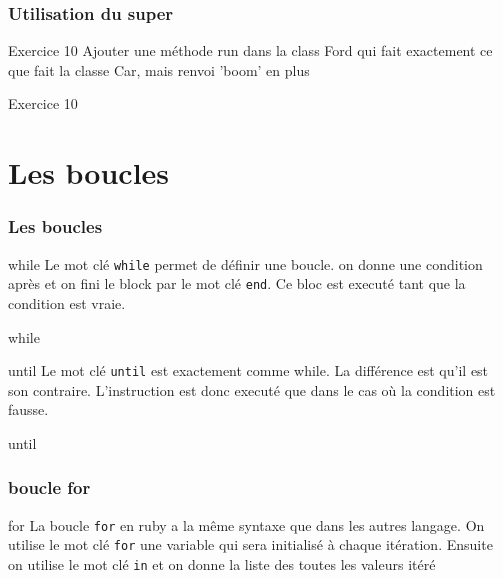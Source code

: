 \documentclass{beamer}
\begin{document}
\begin{frame}
  \frametitle{Utilisation du super}
  \begin{block}{Exercice 10}
  Ajouter une m\'ethode run dans la class Ford qui fait exactement ce que fait la classe Car, mais renvoi 'boom' en plus
\end{block}
\end{frame}

\begin{frame}
  \begin{beamerboxesrounded}{Exercice 10}
    
  \end{beamerboxesrounded}
\end{frame}

\section{Les boucles}

\begin{frame}
  \frametitle{Les boucles}
  \begin{block}{while}
    Le mot cl\'e \verb?while? permet de d\'efinir une boucle. on donne une condition après et on fini le block par le mot cl\'e \verb?end?. Ce bloc est execut\'e tant que la condition est vraie.
  \end{block}
\end{frame}

\begin{frame}
  \begin{block}{while}
    
  \end{block}
\end{frame}

\begin{frame}
  \begin{block}{until}
    Le mot cl\'e \verb?until? est exactement comme while. La diff\'erence est qu'il est son contraire. L'instruction est donc execut\'e que dans le cas où la condition est fausse.
  \end{block}
\end{frame}

\begin{frame}
  \begin{block}{until}
    
  \end{block}
\end{frame}

\begin{frame}
  \frametitle{boucle for}
  \begin{block}{for}
    La boucle \verb?for? en ruby a la même syntaxe que dans les autres langage.
    On utilise le mot cl\'e \verb?for? une variable qui sera initialis\'e à
    chaque it\'eration. Ensuite on utilise le mot cl\'e \verb?in? et on donne
    la liste des toutes les valeurs it\'er\'e
  \end{block}
\end{frame}
\end{document}
